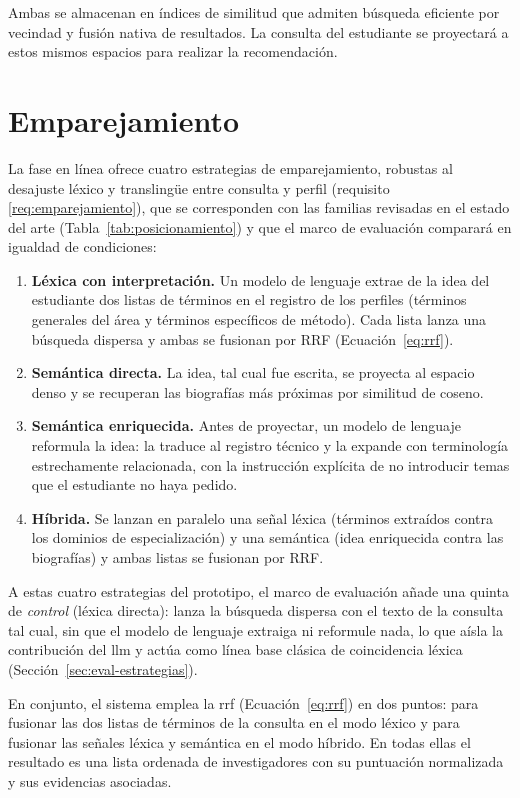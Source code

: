 Ambas se almacenan en índices de similitud que admiten búsqueda eficiente por vecindad y fusión nativa de resultados.
La consulta del estudiante se proyectará a estos mismos espacios para realizar la recomendación.

\section{Emparejamiento}
\label{sec:met-emparejamiento}

La fase en línea ofrece cuatro estrategias de emparejamiento, robustas al desajuste léxico y translingüe entre consulta y perfil (requisito \ref{req:emparejamiento}), que se corresponden con las familias revisadas en el estado del arte (Tabla~\ref{tab:posicionamiento}) y que el marco de evaluación comparará en igualdad de condiciones:

\begin{enumerate}
    \item \textbf{Léxica con interpretación.} Un modelo de lenguaje extrae de la idea del estudiante dos listas de términos en el registro de los perfiles (términos generales del área y términos específicos de método). Cada lista lanza una búsqueda dispersa y ambas se fusionan por RRF (Ecuación~\ref{eq:rrf}).
    \item \textbf{Semántica directa.} La idea, tal cual fue escrita, se proyecta al espacio denso y se recuperan las biografías más próximas por similitud de coseno.
    \item \textbf{Semántica enriquecida.} Antes de proyectar, un modelo de lenguaje reformula la idea: la traduce al registro técnico y la expande con terminología estrechamente relacionada, con la instrucción explícita de no introducir temas que el estudiante no haya pedido.
    \item \textbf{Híbrida.} Se lanzan en paralelo una señal léxica (términos extraídos contra los dominios de especialización) y una semántica (idea enriquecida contra las biografías) y ambas listas se fusionan por RRF.
\end{enumerate}

A estas cuatro estrategias del prototipo, el marco de evaluación añade una quinta de \emph{control} (léxica directa): lanza la búsqueda dispersa con el texto de la consulta tal cual, sin que el modelo de lenguaje extraiga ni reformule nada, lo que aísla la contribución del \gls{llm} y actúa como línea base clásica de coincidencia léxica (Sección~\ref{sec:eval-estrategias}).

En conjunto, el sistema emplea la \gls{rrf} (Ecuación~\ref{eq:rrf}) en dos puntos: para fusionar las dos listas de términos de la consulta en el modo léxico y para fusionar las señales léxica y semántica en el modo híbrido.
En todas ellas el resultado es una lista ordenada de investigadores con su puntuación normalizada y sus evidencias asociadas.

